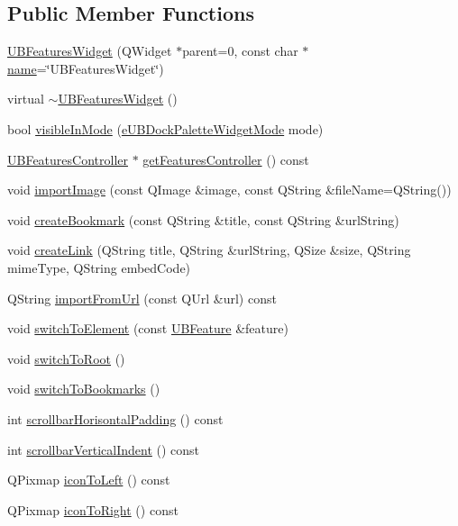 \subsection*{Public Member Functions}
\begin{DoxyCompactItemize}
\item 
\hyperlink{class_u_b_features_widget_a8afc3d83bd8b57f0260c1269f63b435a}{U\-B\-Features\-Widget} (Q\-Widget $\ast$parent=0, const char $\ast$\hyperlink{class_u_b_dock_palette_widget_a1c7779c0584c0d2541b4c05acc1ffbbb}{name}=\char`\"{}U\-B\-Features\-Widget\char`\"{})
\item 
virtual \hyperlink{class_u_b_features_widget_a7b7505bc48708e471b4b2f308613da51}{$\sim$\-U\-B\-Features\-Widget} ()
\item 
bool \hyperlink{class_u_b_features_widget_af22ce8cdddad66f4ef5feab9351858aa}{visible\-In\-Mode} (\hyperlink{_u_b_dock_palette_widget_8h_af3b2828ed1bf91ad13c73e4e1b3b529e}{e\-U\-B\-Dock\-Palette\-Widget\-Mode} mode)
\item 
\hyperlink{class_u_b_features_controller}{U\-B\-Features\-Controller} $\ast$ \hyperlink{class_u_b_features_widget_a946bfb20fe9a568639b4c29d3dfaee13}{get\-Features\-Controller} () const 
\item 
void \hyperlink{class_u_b_features_widget_a0ea71a693142a8fe1fcb0a4eaa3983ff}{import\-Image} (const Q\-Image \&image, const Q\-String \&file\-Name=Q\-String())
\item 
void \hyperlink{class_u_b_features_widget_af136c56999bd58253550b801bd878861}{create\-Bookmark} (const Q\-String \&title, const Q\-String \&url\-String)
\item 
void \hyperlink{class_u_b_features_widget_ab83c320466c7891343ffa9d08aa2998d}{create\-Link} (Q\-String title, Q\-String \&url\-String, Q\-Size \&size, Q\-String mime\-Type, Q\-String embed\-Code)
\item 
Q\-String \hyperlink{class_u_b_features_widget_aab4acbb5fa9d8fba519660c781105d78}{import\-From\-Url} (const Q\-Url \&url) const 
\item 
void \hyperlink{class_u_b_features_widget_ac65a2b7772322d14f33465c770cf4d4d}{switch\-To\-Element} (const \hyperlink{class_u_b_feature}{U\-B\-Feature} \&feature)
\item 
void \hyperlink{class_u_b_features_widget_a2c5b07c7999012faa4d9ea7749f35fe5}{switch\-To\-Root} ()
\item 
void \hyperlink{class_u_b_features_widget_ab29b9f76dd155474f87953271b8f6bec}{switch\-To\-Bookmarks} ()
\item 
int \hyperlink{class_u_b_features_widget_ac6e33c5101c48100ef8a8a656bd8ab66}{scrollbar\-Horisontal\-Padding} () const 
\item 
int \hyperlink{class_u_b_features_widget_a6b31ea1dd487ddc29b244471ccd05840}{scrollbar\-Vertical\-Indent} () const 
\item 
Q\-Pixmap \hyperlink{class_u_b_features_widget_a8e2f90dca75977d5b03115256b62c833}{icon\-To\-Left} () const 
\item 
Q\-Pixmap \hyperlink{class_u_b_features_widget_aa050970cbf30675a9af1ee903b3da45f}{icon\-To\-Right} () const 
\end{DoxyCompactItemize}
